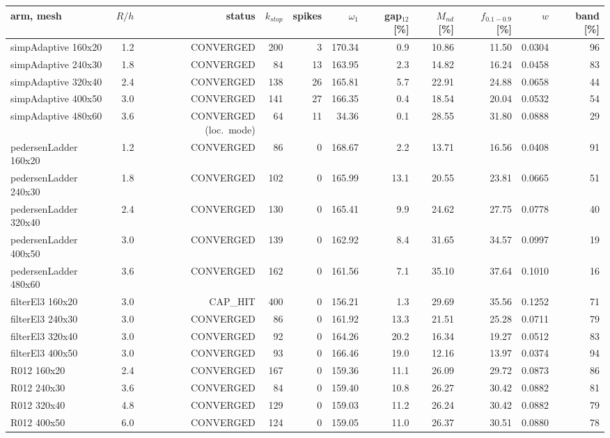 \setlength{\tabcolsep}{2.2pt}
\begin{tabular}{lrrrrrrrrrr}
\toprule
arm, mesh & $R/h$ & status & $k_{stop}$ & spikes & $\omega_1$ & gap$_{12}$ [\%] & $M_{nd}$ [\%] & $f_{0.1-0.9}$ [\%] & $w$ & band [\%] \\
\midrule
simpAdaptive 160x20 & 1.2 & CONVERGED & 200 & 3 & 170.34 & 0.9 & 10.86 & 11.50 & 0.0304 & 96 \\
simpAdaptive 240x30 & 1.8 & CONVERGED & 84 & 13 & 163.95 & 2.3 & 14.82 & 16.24 & 0.0458 & 83 \\
simpAdaptive 320x40 & 2.4 & CONVERGED & 138 & 26 & 165.81 & 5.7 & 22.91 & 24.88 & 0.0658 & 44 \\
simpAdaptive 400x50 & 3.0 & CONVERGED & 141 & 27 & 166.35 & 0.4 & 18.54 & 20.04 & 0.0532 & 54 \\
simpAdaptive 480x60 & 3.6 & CONVERGED (loc.\ mode) & 64 & 11 & 34.36 & 0.1 & 28.55 & 31.80 & 0.0888 & 29 \\
pedersenLadder 160x20 & 1.2 & CONVERGED & 86 & 0 & 168.67 & 2.2 & 13.71 & 16.56 & 0.0408 & 91 \\
pedersenLadder 240x30 & 1.8 & CONVERGED & 102 & 0 & 165.99 & 13.1 & 20.55 & 23.81 & 0.0665 & 51 \\
pedersenLadder 320x40 & 2.4 & CONVERGED & 130 & 0 & 165.41 & 9.9 & 24.62 & 27.75 & 0.0778 & 40 \\
pedersenLadder 400x50 & 3.0 & CONVERGED & 139 & 0 & 162.92 & 8.4 & 31.65 & 34.57 & 0.0997 & 19 \\
pedersenLadder 480x60 & 3.6 & CONVERGED & 162 & 0 & 161.56 & 7.1 & 35.10 & 37.64 & 0.1010 & 16 \\
filterEl3 160x20 & 3.0 & CAP\_HIT & 400 & 0 & 156.21 & 1.3 & 29.69 & 35.56 & 0.1252 & 71 \\
filterEl3 240x30 & 3.0 & CONVERGED & 86 & 0 & 161.92 & 13.3 & 21.51 & 25.28 & 0.0711 & 79 \\
filterEl3 320x40 & 3.0 & CONVERGED & 92 & 0 & 164.26 & 20.2 & 16.34 & 19.27 & 0.0512 & 83 \\
filterEl3 400x50 & 3.0 & CONVERGED & 93 & 0 & 166.46 & 19.0 & 12.16 & 13.97 & 0.0374 & 94 \\
R012 160x20 & 2.4 & CONVERGED & 167 & 0 & 159.36 & 11.1 & 26.09 & 29.72 & 0.0873 & 86 \\
R012 240x30 & 3.6 & CONVERGED & 84 & 0 & 159.40 & 10.8 & 26.27 & 30.42 & 0.0882 & 81 \\
R012 320x40 & 4.8 & CONVERGED & 129 & 0 & 159.03 & 11.2 & 26.24 & 30.42 & 0.0882 & 79 \\
R012 400x50 & 6.0 & CONVERGED & 124 & 0 & 159.05 & 11.0 & 26.37 & 30.51 & 0.0880 & 78 \\

\end{tabular}
